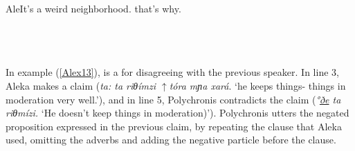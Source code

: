 \documentclass[output=paper]{LSP/langsci}
\begin{document}
\begin{Transcript}[FS {>}{>\hspace{0.1in}}]{Ale}{It’s a weird neighborhood. that’s why.}
\label{Alex12}
\\
 \\   
\\ 
\\ 
\end{Transcript}

In example (\ref{Alex13}),  is a  for disagreeing with the previous speaker. In line 3, Aleka makes a claim (\textit{ta: ta riθímzi $\uparrow$tóra mɲa xará}. `he keeps things- things in moderation very well.'), and in line 5, Polychronis contradicts the claim (\textit{°\underline{ðe} ta riθmízi.} `He doesn’t keep things in moderation)'). Polychronis utters the negated proposition expressed in the previous claim, by repeating the clause that Aleka used, omitting the adverbs and adding the negative particle before the clause.
\end{document}
